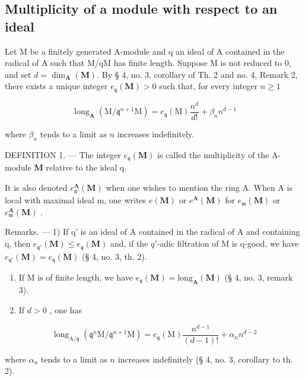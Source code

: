 \subsection{Multiplicity of a module with respect to an ideal}

Let M be a finitely generated A-module and q an ideal of A contained in the radical of A such that M/qM has finite length. Suppose M is not reduced to 0, and set \(d = \dim_{\mathbf{A}}(\mathbf{M})\). By § 4, no. 3, corollary of Th. 2 and no. 4, Remark 2, there exists a unique integer \(e_{\mathfrak{q}}(\mathbf{M}) > 0\) such that, for every integer \(n \geqslant 1\)

\[
\operatorname{long} _ {\mathbf {A}} (\mathrm{M} / \mathfrak {q} ^ {n + 1} \mathrm{M}) = e _ {\mathfrak {q}} (\mathrm{M}) \frac {n ^ {d}}{d !} + \beta_ {n} n ^ {d - 1}
\]

where \(\beta_{n}\) tends to a limit as \(n\) increases indefinitely.

DEFINITION 1. --- The integer \(e_{\mathfrak{q}}(\mathbf{M})\) is called the multiplicity of the A-module \(\mathbf{M}\) relative to the ideal q.

It is also denoted \(e_{\mathfrak{q}}^{\mathbf{A}}(\mathbf{M})\) when one wishes to mention the ring A. When A is local with maximal ideal m, one writes \(e(\mathbf{M})\) or \(e^{\mathbf{A}}(\mathbf{M})\) for \(e_{\mathfrak{m}}(\mathbf{M})\) or \(e_{\mathfrak{m}}^{\mathbf{A}}(\mathbf{M})\) .

Remarks. --- 1) If q' is an ideal of A contained in the radical of A and containing q, then \(e_{\mathfrak{q}'}(\mathbf{M}) \leqslant e_{\mathfrak{q}}(\mathbf{M})\) and, if the \(q'\)-adic filtration of M is q-good, we have \(e_{\mathfrak{q}'}(\mathbf{M}) = e_{\mathfrak{q}}(\mathbf{M})\) (§ 4, no. 3, th. 2).

\begin{enumerate}
\def\labelenumi{\arabic{enumi})}
\setcounter{enumi}{1}
\item
  If M is of finite length, we have \(e_{\mathfrak{q}}(\mathbf{M}) = \mathrm{long}_{\mathbf{A}}(\mathbf{M})\) (§ 4, no. 3, remark 3).
\item
  If \(d > 0\) , one has
\end{enumerate}

\[
\operatorname{long} _ {\mathrm{A} / \mathfrak {q}} (\mathfrak {q} ^ {n} \mathrm{M} / \mathfrak {q} ^ {n + 1} \mathrm{M}) = e _ {\mathfrak {q}} (\mathrm{M}) \frac {n ^ {d - 1}}{(d - 1) !} + \alpha_ {n} n ^ {d - 2}
\]

where \(\alpha_{n}\) tends to a limit as \(n\) increases indefinitely (§ 4, no. 3, corollary to th. 2).

